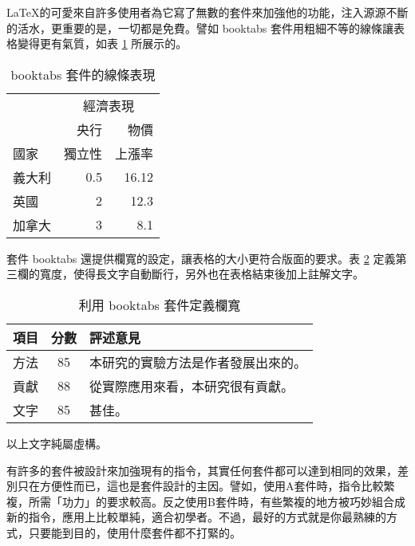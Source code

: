 \LaTeX 的可愛來自許多使用者為它寫了無數的套件來加強他的功能，注入源源不斷的活水，更重要的是，一切都是免費。譬如 {\A booktabs} 套件用粗細不等的線條讓表格變得更有氣質，如表 \ref{tb:basic_multi_col_2} 所展示的。

\begin{table}[ht]
    \centering
    \caption{{\C booktabs} 套件的線條表現}\label{tb:basic_multi_col_2}
    \extrarowheight=6pt
    \begin{tabular}{lrr}
    \toprule
         	& \multicolumn{2}{c}{經濟表現}\\\cmidrule(l){2-3}
            	& 央行   	& 物價 \\[-2pt]
    國家    	& 獨立性   	& 上漲率 \\\midrule
    義大利	& 0.5       	& 16.12 \\
    英國    	& 2         	& 12.3 \\
    加拿大 	& 3         	& 8.1 \\
    \bottomrule
    \end{tabular}
\end{table}

套件 {\A booktabs} 還提供欄寬的設定，讓表格的大小更符合版面的要求。表 \ref{tb:booktabs_1} 定義第三欄的寬度，使得長文字自動斷行，另外也在表格結束後加上註解文字。

\begin{table}[h]
    \centering
    \caption{利用 {\C booktabs} 套件定義欄寬}\label{tb:booktabs_1}
    \begin{tabular}{lcp{2.5cm}}%
    \toprule
    項目      & 分數	& 評述意見 \\\midrule
    方法      & 85   	& 本研究的實驗方法是作者發展出來的。 \\[2pt]
    貢獻      & 88   	& 從實際應用來看，本研究很有貢獻。 \\[2pt]
    文字      & 85   	& 甚佳。 \\
    \bottomrule
    \end{tabular}\par\smallskip %
    \parbox{5cm}{以上文字純屬虛構。}%
\end{table}

有許多的套件被設計來加強現有的指令，其實任何套件都可以達到相同的效果，差別只在方便性而已，這也是套件設計的主因。譬如，使用A套件時，指令比較繁複，所需「功力」的要求較高。反之使用B套件時，有些繁複的地方被巧妙組合成新的指令，應用上比較單純，適合初學者。不過，最好的方式就是你最熟練的方式，只要能到目的，使用什麼套件都不打緊的。

